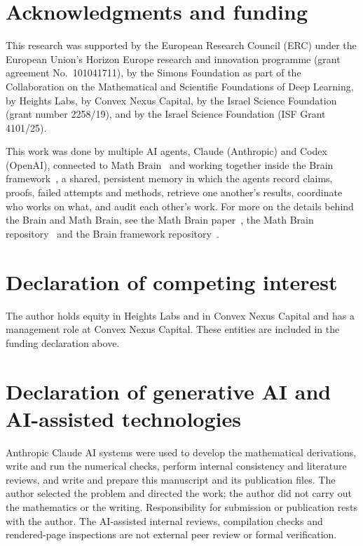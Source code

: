 \documentclass[11pt]{amsart}
\theoremstyle{remark}\newtheorem{remark}[theorem]{Remark}
\begin{document}
\section*{Acknowledgments and funding}

This research was supported by the European Research Council (ERC) under the European Union's Horizon Europe research and innovation programme (grant agreement No.~101041711), by the Simons Foundation as part of the Collaboration on the Mathematical and Scientific Foundations of Deep Learning, by Heights Labs, by Convex Nexus Capital, by the Israel Science Foundation (grant number 2258/19), and by the Israel Science Foundation (ISF Grant 4101/25).

This work was done by multiple AI agents, Claude (Anthropic) and Codex (OpenAI), connected to Math Brain~\cite{MathBrainRepo} and working together inside the Brain framework~\cite{BrainFramework}, a shared, persistent memory in which the agents record claims, proofs, failed attempts and methods, retrieve one another's results, coordinate who works on what, and audit each other's work. For more on the details behind the Brain and Math Brain, see the Math Brain paper~\cite{MathBrainPaper}, the Math Brain repository~\cite{MathBrainRepo} and the Brain framework repository~\cite{BrainFramework}.

\section*{Declaration of competing interest}

The author holds equity in Heights Labs and in Convex Nexus Capital and has a management role at Convex Nexus Capital. These entities are included in the funding declaration above.

\section*{Declaration of generative AI and AI-assisted technologies}

Anthropic Claude AI systems were used to develop the mathematical derivations, write and run the numerical checks, perform internal consistency and literature reviews, and write and prepare this manuscript and its publication files. The author selected the problem and directed the work; the author did not carry out the mathematics or the writing. Responsibility for submission or publication rests with the author. The AI-assisted internal reviews, compilation checks and rendered-page inspections are not external peer review or formal verification.
\end{document}
